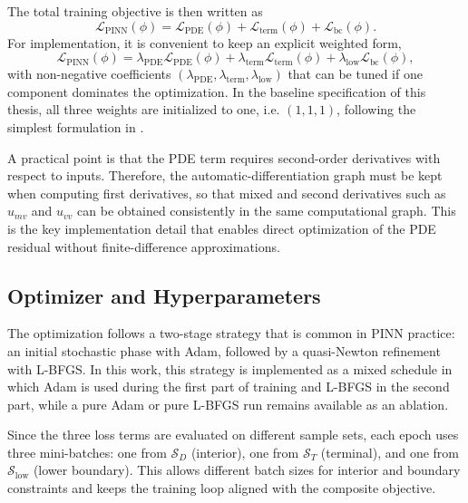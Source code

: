 The total training objective is then written as
\begin{equation}
\mathcal{L}_{\mathrm{PINN}}(\phi)=
\mathcal{L}_{\mathrm{PDE}}(\phi)+
\mathcal{L}_{\mathrm{term}}(\phi)+
\mathcal{L}_{\mathrm{bc}}(\phi).
\end{equation}
For implementation, it is convenient to keep an explicit weighted form,
\begin{equation}
\mathcal{L}_{\mathrm{PINN}}(\phi)=
\lambda_{\mathrm{PDE}}\mathcal{L}_{\mathrm{PDE}}(\phi)+
\lambda_{\mathrm{term}}\mathcal{L}_{\mathrm{term}}(\phi)+
\lambda_{\mathrm{low}}\mathcal{L}_{\mathrm{bc}}(\phi),
\end{equation}
with non-negative coefficients $(\lambda_{\mathrm{PDE}},\lambda_{\mathrm{term}},\lambda_{\mathrm{low}})$ that can be tuned if one component dominates the optimization. In the baseline specification of this thesis, all three weights are initialized to one, i.e. $(1,1,1)$, following the simplest formulation in \cite{hainaut2024pinn}.

A practical point is that the PDE term requires second-order derivatives with respect to inputs. Therefore, the automatic-differentiation graph must be kept when computing first derivatives, so that mixed and second derivatives such as $u_{mv}$ and $u_{vv}$ can be obtained consistently in the same computational graph. This is the key implementation detail that enables direct optimization of the PDE residual without finite-difference approximations.

\subsection{Optimizer and Hyperparameters}

The optimization follows a two-stage strategy that is common in PINN practice: an initial stochastic phase with Adam, followed by a quasi-Newton refinement with L-BFGS. In this work, this strategy is implemented as a mixed schedule in which Adam is used during the first part of training and L-BFGS in the second part, while a pure Adam or pure L-BFGS run remains available as an ablation.

Since the three loss terms are evaluated on different sample sets, each epoch uses three mini-batches: one from $\mathcal{S}_D$ (interior), one from $\mathcal{S}_T$ (terminal), and one from $\mathcal{S}_{\mathrm{low}}$ (lower boundary). This allows different batch sizes for interior and boundary constraints and keeps the training loop aligned with the composite objective.

